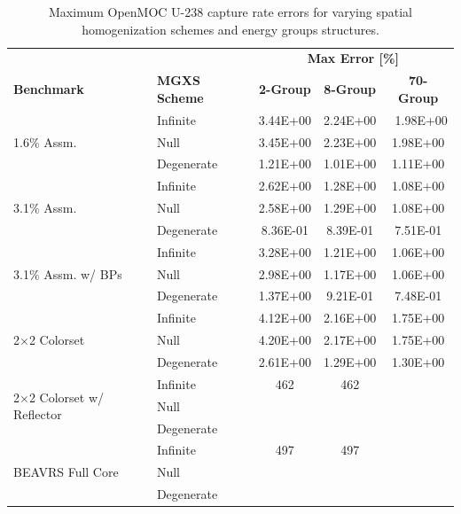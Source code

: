 \begin{table}[h!]
  \centering
  \caption[Maximum OpenMOC U-238 capture rate errors]{Maximum OpenMOC U-238 capture rate errors for varying spatial homogenization schemes and energy groups structures.}
  \small
  \label{table:chap8-openmoc-max-capt-rates}
  \vspace{6pt}
  \begin{tabular}{l l c c c}
  \toprule
  \rowcolor{lightgray}
  & & \multicolumn{3}{c}{\cellcolor{lightgray} \textbf{Max Error [\%]}} \\
  \multirow{-2}{*}{\cellcolor{lightgray} \bf Benchmark} &
  \multirow{-2}{*}{\cellcolor{lightgray} \bf \ac{MGXS} Scheme} &
  {\cellcolor{lightgray} \bf 2-Group} &
  {\cellcolor{lightgray} \bf 8-Group} &
  {\cellcolor{lightgray} \bf 70-Group} \\
  \midrule
\multirow{3}{*}{\parbox{2.5cm}{1.6\% Assm.}} & Infinite & 3.44E+00 & 2.24E+00 &\
 1.98E+00 \\
& Null & 3.45E+00 & 2.23E+00 & 1.98E+00 \\
& Degenerate & 1.21E+00 & 1.01E+00 & 1.11E+00 \\
  \midrule
\multirow{3}{*}{\parbox{2.5cm}{3.1\% Assm.}} & Infinite & 2.62E+00 & 1.28E+00 & 1.08E+00 \\
& Null & 2.58E+00 & 1.29E+00 & 1.08E+00 \\
& Degenerate & 8.36E-01 & 8.39E-01 & 7.51E-01 \\
  \midrule
\multirow{3}{*}{\parbox{2.5cm}{3.1\% Assm. w/ \acp{BP}}} & Infinite & 3.28E+00 & 1.21E+00 & 1.06E+00 \\
& Null & 2.98E+00 & 1.17E+00 & 1.06E+00 \\
& Degenerate & 1.37E+00 & 9.21E-01 & 7.48E-01 \\
  \midrule
  \multirow{3}{*}{\parbox{2.5cm}{2$\times$2 Colorset}} & Infinite & 4.12E+00 & 2.16E+00 & 1.75E+00 \\
& Null & 4.20E+00 & 2.17E+00 & 1.75E+00 \\
& Degenerate & 2.61E+00 & 1.29E+00 & 1.30E+00 \\
  \midrule
  \multirow{3}{*}{\parbox{2.3cm}{2$\times$2 Colorset w/ Reflector}} & Infinite & 462 & 462 & \\
  & Null & & & \\
  & Degenerate & & & \\
  \midrule
  \multirow{3}{*}{\parbox{2cm}{\ac{BEAVRS} Full Core}} & Infinite & 497 & 497 & \\
  & Null & & & \\
  & Degenerate & & & \\
  \bottomrule
\end{tabular}
\end{table}

